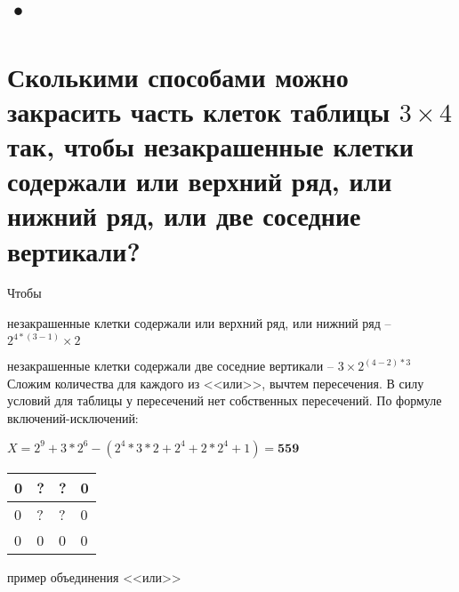 \documentclass[a4paper,11pt]{article}
\begin{document}
\section{•}

\section{Сколькими способами можно закрасить часть клеток таблицы $3 \times 4$ так,
чтобы незакрашенные клетки содержали или верхний ряд, или нижний ряд, или
две соседние вертикали?}
Чтобы

 незакрашенные клетки содержали или верхний ряд, или нижний ряд -- $2^{4*(3-1)} \times 2$ 
 
 незакрашенные клетки содержали две соседние вертикали -- $ 3 \times 2^{(4-2)*3} $
Сложим количества для каждого из <<или>>, вычтем пересечения. В силу условий для таблицы у пересечений нет собственных пересечений.
По формуле включений-исключений: 

$X = 2^{9} + 3*2^6 - (2^4*3*2 +2^4+2*2^4+1) = \textbf{559}$

\begin{tabular}{ | l | l | l | l | }
\hline
0 & ? & ? & 0\\ \hline
0 & ? & ? & 0\\ \hline
0 & 0 & 0 & 0\\ \hline
\end{tabular} пример объединения <<или>>
\end{document}
